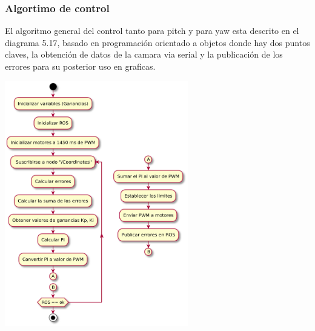 \subsubsection{Algortimo de control}
El algoritmo general del control tanto para pitch y para yaw esta descrito en el diagrama 5.17, basado en programación orientado a objetos
donde hay dos puntos claves, la obtención de datos de la camara via serial y la publicación de los errores para su posterior uso en graficas.
\begin{center}
	\includegraphics[width=0.6\textwidth]{Contenido/Cuerpo/Capitulo5/Fig24.eps}
	\label{Fig4}
\end{center}

